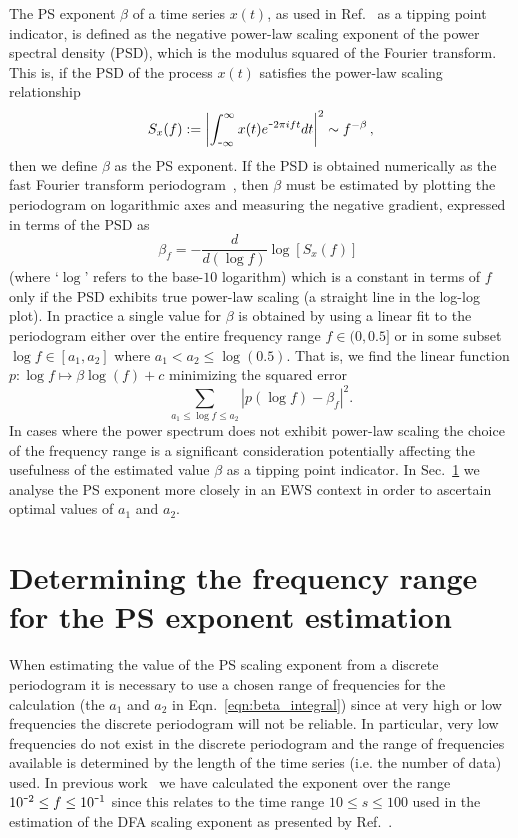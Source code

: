 \documentclass[10pt]{iopart}
\newcommand{\m}{\textup{\texttt{-}}}
\begin{document}
The PS exponent $\beta$ of a time series $x(t)$, as used in Ref.~\cite{prettyman2019} as a tipping point indicator, is defined as the negative power-law scaling exponent of the power spectral density (PSD), which is the modulus squared of the Fourier transform. This is, if the PSD of the process $x(t)$ satisfies the power-law scaling relationship
\begin{equation}
	\label{eqn:1D:power_spectrum_def}
	S_x(f) := \left|\int_{\m \infty}^{\infty} x(t) e^{\m 2\pi i f t} dt\right|^2\sim f^{-\beta}\,,
\end{equation}
then we define $\beta$ as the PS exponent. If the PSD is obtained numerically as the fast Fourier transform periodogram~\cite{prettyman2018,prettyman2019}, then $\beta$ must be estimated by plotting the periodogram on logarithmic axes and measuring the negative gradient, expressed in terms of the PSD as 
\begin{equation}
	\beta_f = -\frac{d}{d(\log f)}\log\left[S_x(f)\right]\,\
	\label{eqn:PSD_derivative}
\end{equation}
(where `$\log$' refers to the base-$10$ logarithm) which is a constant in terms of $f$ only if the PSD exhibits true power-law scaling (a straight line in the log-log plot). In practice a single value for $\beta$ is obtained by using a linear fit to the periodogram either over the entire frequency range $f\in(0,0.5]$ or in some subset $\log f\in[a_1, a_2]$ where $a_1<a_2\leq\log(0.5)$. That is, we find the linear function $p:\log f\mapsto\beta\log(f)+c$ minimizing the squared error
\begin{equation}
	\sum_{a_1 \leq \log f\leq a_2} |p(\log f) - \beta_f|^2.
	\label{eqn:beta_integral}
\end{equation}
In cases where the power spectrum does not exhibit power-law scaling the choice of the frequency range is a significant consideration potentially affecting the usefulness of the estimated value $\beta$ as a tipping point indicator. In Sec.~\ref{sec:frequencyRange} we analyse the PS exponent more closely in an EWS context in order to ascertain optimal values of $a_1$ and $a_2$. 


\section[PS exponent frequency range]{Determining the frequency range for the PS exponent estimation}
\label{sec:frequencyRange}

When estimating the value of the PS scaling exponent from a discrete periodogram it is necessary to use a chosen range of frequencies for the calculation (the $a_1$ and $a_2$ in Eqn.~\ref{eqn:beta_integral}) since at very high or low frequencies the discrete periodogram will not be reliable. In particular, very low frequencies do not exist in the discrete periodogram and the range of frequencies available is determined by the length of the time series (i.e. the number of data) used. In previous work~\cite{prettyman2019, prettyman2021} we have calculated the exponent over the range $10^{\m2} \leq f \leq 10^{\m1}$ since this relates to the time range $10 \leq s \leq 100$ used in the estimation of the DFA scaling exponent as presented by Ref.~\cite{livina2007}. 
\end{document}
